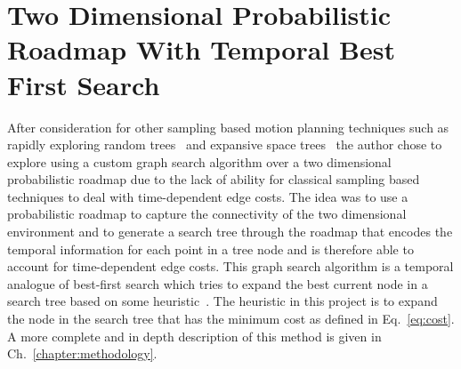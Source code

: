 \section{Two Dimensional Probabilistic Roadmap With Temporal Best First Search}

\label{sec:finaldesign}

After consideration for other sampling based motion planning techniques such as
rapidly exploring random trees~\cite{rrt} and expansive space trees~\cite{est}
the author chose to explore using a custom graph search algorithm over a two
dimensional probabilistic roadmap due to the lack of ability for classical
sampling based techniques to deal with time-dependent edge costs. The idea was
to use a probabilistic roadmap to capture the connectivity of the two
dimensional environment and to generate a search tree through the roadmap that
encodes the temporal information for each point in a tree node and is therefore
able to account for time-dependent edge costs. This graph search algorithm is a
temporal analogue of best-first search which tries to expand the best current
node in a search tree based on some heuristic~\cite{bestfs}. The heuristic in
this project is to expand the node in the search tree that has the minimum cost
as defined in Eq.~\ref{eq:cost}. A more complete and in depth description of
this method is given in Ch.~\ref{chapter:methodology}.


